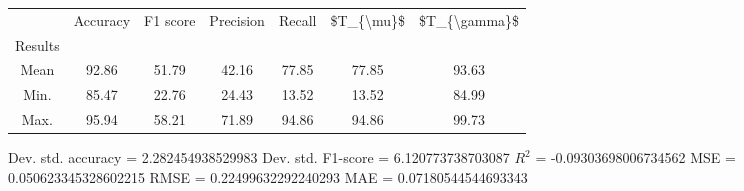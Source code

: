 \begin{tabular}{|c|c|c|c|c|c|c|}
\toprule
{} &  Accuracy &  F1 score &  Precision &  Recall &  \$T\_\{\textbackslash mu\}\$ &  \$T\_\{\textbackslash gamma\}\$ \\
Results &           &           &            &         &            &               \\
\hline
Mean    &     92.86 &     51.79 &      42.16 &   77.85 &      77.85 &         93.63 \\
Min.    &     85.47 &     22.76 &      24.43 &   13.52 &      13.52 &         84.99 \\
Max.    &     95.94 &     58.21 &      71.89 &   94.86 &      94.86 &         99.73 \\
\bottomrule
\end{tabular}

 Dev. std. accuracy = 2.282454938529983
 Dev. std. F1-score = 6.120773738703087
 $R^2$ = -0.09303698006734562
 MSE = 0.050623345328602215
 RMSE = 0.22499632292240293
 MAE = 0.07180544544693343